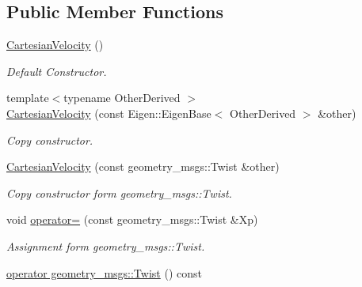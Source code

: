 \subsection*{Public Member Functions}
\begin{DoxyCompactItemize}
\item 
\hyperlink{classow__core_1_1CartesianVelocity_a9101c643b5b96005b9fa87439c6bf805}{Cartesian\+Velocity} ()\hypertarget{classow__core_1_1CartesianVelocity_a9101c643b5b96005b9fa87439c6bf805}{}\label{classow__core_1_1CartesianVelocity_a9101c643b5b96005b9fa87439c6bf805}

\begin{DoxyCompactList}\small\item\em Default Constructor. \end{DoxyCompactList}\item 
{\footnotesize template$<$typename Other\+Derived $>$ }\\\hyperlink{classow__core_1_1CartesianVelocity_a3b2f280aae9e691e428c6317aa608d61}{Cartesian\+Velocity} (const Eigen\+::\+Eigen\+Base$<$ Other\+Derived $>$ \&other)
\begin{DoxyCompactList}\small\item\em Copy constructor. \end{DoxyCompactList}\item 
\hyperlink{classow__core_1_1CartesianVelocity_a941e816cd2c1aacaef90fa02f75b2433}{Cartesian\+Velocity} (const geometry\+\_\+msgs\+::\+Twist \&other)\hypertarget{classow__core_1_1CartesianVelocity_a941e816cd2c1aacaef90fa02f75b2433}{}\label{classow__core_1_1CartesianVelocity_a941e816cd2c1aacaef90fa02f75b2433}

\begin{DoxyCompactList}\small\item\em Copy constructor form geometry\+\_\+msgs\+::\+Twist. \end{DoxyCompactList}\item 
void \hyperlink{classow__core_1_1CartesianVelocity_ac4abf76a3ffb12d811c7ede84aeb0281}{operator=} (const geometry\+\_\+msgs\+::\+Twist \&Xp)\hypertarget{classow__core_1_1CartesianVelocity_ac4abf76a3ffb12d811c7ede84aeb0281}{}\label{classow__core_1_1CartesianVelocity_ac4abf76a3ffb12d811c7ede84aeb0281}

\begin{DoxyCompactList}\small\item\em Assignment form geometry\+\_\+msgs\+::\+Twist. \end{DoxyCompactList}\item 
\hyperlink{classow__core_1_1CartesianVelocity_ad3566f959c904cf22a4f1228290f8c15}{operator geometry\+\_\+msgs\+::\+Twist} () const \hypertarget{classow__core_1_1CartesianVelocity_ad3566f959c904cf22a4f1228290f8c15}{}\label{classow__core_1_1CartesianVelocity_ad3566f959c904cf22a4f1228290f8c15}


\end{DoxyCompactItemize}

